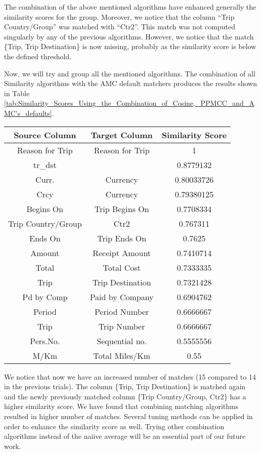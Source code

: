 The combination of the above mentioned algorithms have enhanced generally the similarity scores for the group. Moreover, we notice that the column ``Trip Country/Group'' was matched with ``Ctr2''. This match was not computed singularly by any of the previous algorithms. However, we notice that the match \{Trip, Trip Destination\} is now missing, probably as the similarity score is below the defined threshold.

Now, we will try and group all the mentioned algorithms. The combination of all Similarity algorithms with the AMC default matchers produces the results shown in Table \ref{tab:Similarity_Scores_Using_the_Combination_of_Cosine,_PPMCC_and_AMC's_defaults}.

\begin{table}[ht]
\centering
\begin{tabular}{|c|c|c|} \hline
\textbf{Source Column} & \textbf{Target Column} & \textbf{Similarity Score} \\ \hline
Reason for Trip & Reason for Trip & 1 \\ \hline
tr\_dst &  & 0.8779132 \\ \hline
Curr. & Currency & 0.80033726 \\ \hline
Crcy & Currency & 0.79380125 \\ \hline
Begins On & Trip Begins On & 0.7708334 \\ \hline
Trip Country/Group & Ctr2 & 0.767311 \\ \hline
Ends On & Trip Ends On & 0.7625 \\ \hline
Amount & Receipt Amount & 0.7410714 \\ \hline
Total & Total Cost & 0.7333335 \\ \hline
Trip & Trip Destination & 0.7321428 \\ \hline
Pd by Comp & Paid by Company & 0.6904762 \\ \hline
Period & Period Number & 0.6666667 \\ \hline
Trip & Trip Number & 0.6666667 \\ \hline
Pers.No. & Sequential no. & 0.5555556 \\ \hline
M/Km & Total Miles/Km & 0.55 \\ \hline
\end{tabular}
\end{table}

We notice that now we have an increased number of matches (15 compared to 14 in the previous trials). The column \{Trip, Trip Destination\} is matched again and the newly previously matched column \{Trip Country/Group, Ctr2\} has a higher similarity score. We have found that combining matching algorithms resulted in higher number of matches. Several tuning methods can be applied in order to enhance the similarity score as well. Trying other combination algorithms instead of the naiive average will be an essential part of our future work. \\ \\

